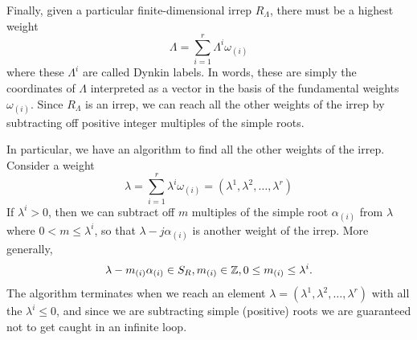 Finally, given a particular finite-dimensional irrep $R_\Lambda$, there must be a highest weight
$$\Lambda=\sum_{i=1}^r \Lambda^i \omega_{(i)}$$
where these $\Lambda^i$ are called Dynkin labels. In words, these are simply the coordinates of $\Lambda$ interpreted as a vector in the basis of the fundamental weights $\omega_{(i)}$. Since $R_\Lambda$ is an irrep, we can reach all the other weights of the irrep by subtracting off positive integer multiples of the simple roots.

In particular, we have an algorithm to find all the other weights of the irrep. Consider a weight $$\lambda=\sum_{i=1}^r \lambda^i \omega_{(i)}=(\lambda^1,\lambda^2,\ldots,\lambda^r)$$ 
If $\lambda^i >0$, then we can subtract off $m$ multiples of the simple root $\alpha_{(i)}$ from $\lambda$ where $0<m\leq \lambda^i$, so that $\lambda-j\alpha_{(i)}$ is another weight of the irrep. More generally,
$$\lambda-m_{(i)} \alpha_{(i)} \in S_R, m_{(i)}\in \mathbb{Z}, 0\leq m_{(i)}\leq \lambda^i.$$
The algorithm terminates when we reach an element $\lambda=(\lambda^1,\lambda^2,\ldots,\lambda^r)$ with all the $\lambda^i \leq 0$, and since we are subtracting simple (positive) roots we are guaranteed not to get caught in an infinite loop.